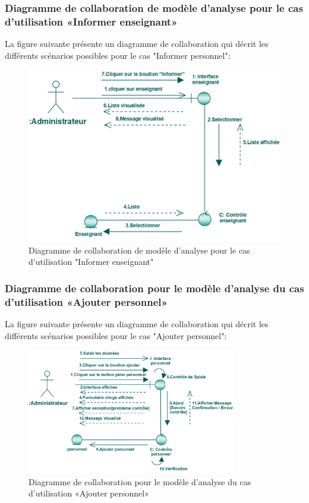 \documentclass[12 pt ]{report}
\begin{document}
\subsubsection{Diagramme  de  collaboration  de  modèle  d'analyse  pour  le  cas  d'utilisation «Informer enseignant»  }
La figure suivante présente un diagramme de collaboration qui décrit les différents
scénarios possibles pour le cas "Informer personnel":
\begin{figure}[h]
\begin{center}
\includegraphics[width= 12 cm , height =6 cm]{colla_admin_informerenseignant.png}
 \caption{Diagramme  de  collaboration  de  modèle  d'analyse  pour  le  cas  d'utilisation "Informer enseignant"}
\end{center}
\end{figure}
\subsubsection{Diagramme de collaboration pour le modèle d’analyse du cas d'utilisation                                       «Ajouter personnel»}
La figure suivante présente un diagramme de collaboration qui décrit les différents
scénarios possibles pour le cas "Ajouter personnel":\begin{figure}[h]
 \begin{center}
\includegraphics[width= 12 cm ,height=  5.5cm]{collaajoutper.PNG}
\caption{Diagramme de collaboration pour le modèle d’analyse du cas d'utilisation                                       «Ajouter personnel»}

\end{center}
\end{figure}
\end{document}

